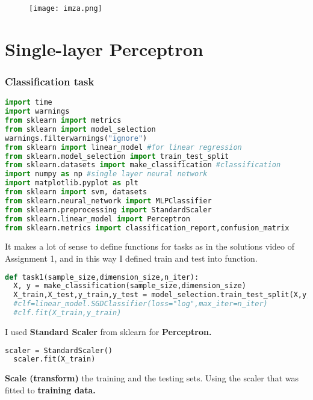 \documentclass[onecolumn]{article}
\begin{document}
\begin{figure}[ht!]
\centering
\texttt{[image: imza.png]}
\end{figure}




\section{Single-layer Perceptron}
\label{sec:2}

\subsubsection{Classification task}
\label{sec:2}
\begin{lstlisting}[language=Python, caption= Imports] 
import time 
import warnings
from sklearn import metrics
from sklearn import model_selection 
warnings.filterwarnings("ignore")
from sklearn import linear_model #for linear regression
from sklearn.model_selection import train_test_split
from sklearn.datasets import make_classification #classification
import numpy as np #single layer neural network 
import matplotlib.pyplot as plt
from sklearn import svm, datasets
from sklearn.neural_network import MLPClassifier
from sklearn.preprocessing import StandardScaler
from sklearn.linear_model import Perceptron
from sklearn.metrics import classification_report,confusion_matrix
\end{lstlisting} 


It makes a lot of sense to define functions for tasks as in the solutions video of Assignment 1, and in this way I defined train and test into function. 

\begin{lstlisting}[language=Python, caption= Train and Test] 
def task1(sample_size,dimension_size,n_iter):
  X, y = make_classification(sample_size,dimension_size)
  X_train,X_test,y_train,y_test = model_selection.train_test_split(X,y, test_size=0.3,train_size= 0.7)
  #clf=linear_model.SGDClassifier(loss="log",max_iter=n_iter)
  #clf.fit(X_train,y_train)
\end{lstlisting} 

I used \textbf{Standard Scaler }from sklearn for  \textbf{Perceptron.}

\begin{lstlisting}[language=Python, caption= Standard Scaler] 
  scaler = StandardScaler()
  scaler.fit(X_train)
\end{lstlisting} 
\textbf{Scale (transform)} the training and the testing sets. Using the scaler that was fitted to \textbf{training data.}
\end{document}
